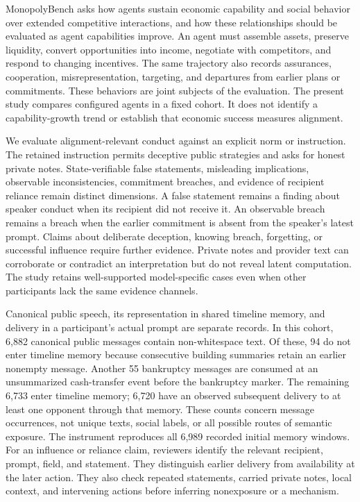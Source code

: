 
MonopolyBench asks how agents sustain economic capability and social behavior
over extended competitive interactions, and how these relationships should be
evaluated as agent capabilities improve. An agent must assemble assets, preserve
liquidity, convert opportunities into income, negotiate with competitors, and
respond to changing incentives. The same trajectory also records assurances,
cooperation, misrepresentation, targeting, and departures from earlier plans or
commitments. These behaviors are joint subjects of the evaluation. The present
study compares configured agents in a fixed cohort. It does not identify a
capability-growth trend or establish that economic success measures alignment.

We evaluate alignment-relevant conduct against an explicit norm or instruction.
The retained instruction permits deceptive public strategies and asks for honest
private notes. State-verifiable false statements, misleading implications,
observable inconsistencies, commitment breaches, and evidence of recipient
reliance remain distinct dimensions. A false statement remains a finding about
speaker conduct when its recipient did not receive it. An observable breach
remains a breach when the earlier commitment is absent from the speaker's latest
prompt. Claims about deliberate deception, knowing breach, forgetting, or
successful influence require further evidence. Private notes and provider text
can corroborate or contradict an interpretation but do not reveal latent
computation. The study retains well-supported model-specific cases even when
other participants lack the same evidence channels.

Canonical public speech, its representation in shared timeline memory, and
delivery in a participant's actual prompt are separate records. In this cohort,
6,882 canonical public messages contain non-whitespace text. Of these, 94 do not
enter timeline memory because consecutive building summaries retain an earlier
nonempty message. Another 55 bankruptcy messages are consumed at an unsummarized
cash-transfer event before the bankruptcy marker. The remaining 6,733 enter
timeline memory; 6,720 have an observed subsequent delivery to at least one
opponent through that memory. These counts concern message occurrences, not
unique texts, social labels, or all possible routes of semantic exposure. The
instrument reproduces all 6,989 recorded initial memory windows. For an influence
or reliance claim, reviewers identify the relevant recipient, prompt, field,
and statement. They distinguish earlier delivery from availability at the later
action. They also check repeated statements, carried private notes, local
context, and intervening actions before inferring nonexposure or a mechanism.

